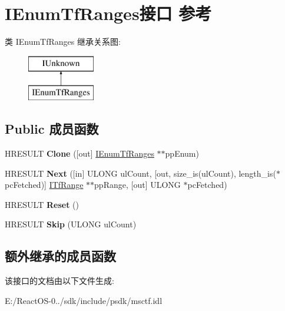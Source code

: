 \hypertarget{interface_i_enum_tf_ranges}{}\section{I\+Enum\+Tf\+Ranges接口 参考}
\label{interface_i_enum_tf_ranges}
类 I\+Enum\+Tf\+Ranges 继承关系图\+:\begin{figure}[H]
\begin{center}
\leavevmode
\includegraphics[height=2.000000cm]{interface_i_enum_tf_ranges}
\end{center}
\end{figure}
\subsection*{Public 成员函数}
\begin{DoxyCompactItemize}
\item 
\mbox{\label{interface_i_enum_tf_ranges_abd314b53243f8cf11978488c51042a43}} 
H\+R\+E\+S\+U\+LT {\bfseries Clone} (\mbox{[}out\mbox{]} \hyperlink{interface_i_enum_tf_ranges}{I\+Enum\+Tf\+Ranges} $\ast$$\ast$pp\+Enum)
\item 
\mbox{\label{interface_i_enum_tf_ranges_ad31d051d9736d577fa66ded6e1b345f2}} 
H\+R\+E\+S\+U\+LT {\bfseries Next} (\mbox{[}in\mbox{]} U\+L\+O\+NG ul\+Count, \mbox{[}out, size\+\_\+is(ul\+Count), length\+\_\+is($\ast$pc\+Fetched)\mbox{]} \hyperlink{interface_i_tf_range}{I\+Tf\+Range} $\ast$$\ast$pp\+Range, \mbox{[}out\mbox{]} U\+L\+O\+NG $\ast$pc\+Fetched)
\item 
\mbox{\label{interface_i_enum_tf_ranges_a8bc835e4a1178556690c1cd67b220970}} 
H\+R\+E\+S\+U\+LT {\bfseries Reset} ()
\item 
\mbox{\label{interface_i_enum_tf_ranges_af5d4235985ccfcbd8305c284f1754ba4}} 
H\+R\+E\+S\+U\+LT {\bfseries Skip} (U\+L\+O\+NG ul\+Count)
\end{DoxyCompactItemize}
\subsection*{额外继承的成员函数}


该接口的文档由以下文件生成\+:\begin{DoxyCompactItemize}
\item 
E\+:/\+React\+O\+S-\/0../sdk/include/psdk/msctf.\+idl\end{DoxyCompactItemize}
